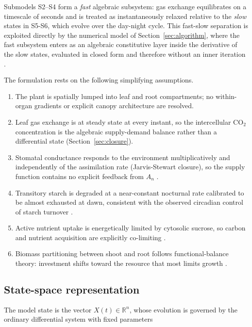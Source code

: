 \documentclass[a4paper,fleqn]{cas-sc}
\begin{document}
Submodels S2--S4 form a \emph{fast} algebraic subsystem: gas exchange
equilibrates on a timescale of seconds and is treated as instantaneously
relaxed relative to the \emph{slow} states in S5-S6, which evolve over the
day-night cycle. This fast-slow separation is exploited directly by the
numerical model of Section~\ref{sec:algorithm}, where the fast subsystem
enters as an algebraic constitutive layer inside the derivative of the slow
states, evaluated in closed form and therefore without an inner iteration
\citep{Cellier1991}.

The formulation rests on the following simplifying assumptions.
\begin{enumerate}\itemsep1pt
\item[(A1)] The plant is spatially lumped into leaf and root compartments;
      no within-organ gradients or explicit canopy architecture are
      resolved.
\item[(A2)] Leaf gas exchange is at steady state at every instant, so
      the intercellular CO$_2$ concentration is the algebraic supply-demand
      balance rather than a differential state (Section~\ref{sec:closure}).
\item[(A3)] Stomatal conductance responds to the environment
      multiplicatively and independently of the assimilation rate
      (Jarvis-Stewart closure), so the supply function contains no explicit
      feedback from $A_n$ \citep{Jarvis1976,Damour2010}.
\item[(A4)] Transitory starch is degraded at a near-constant nocturnal rate
      calibrated to be almost exhausted at dawn, consistent with the
      observed circadian control of starch turnover
      \citep{Graf2010,Scialdone2013}.
\item[(A5)] Active nutrient uptake is energetically limited by cytosolic
      sucrose, so carbon and nutrient acquisition are explicitly co-limiting
      \citep{Smith2007}.
\item[(A6)] Biomass partitioning between shoot and root follows
      functional-balance theory: investment shifts toward the resource that
      most limits growth \citep{Thornley1972,ThornleyJohnson1990}.
\end{enumerate}

\subsection{State-space representation}
\label{sec:state}

The model state is the vector $X(t)\in\mathbb{R}^{n}$, whose evolution is
governed by the ordinary differential system with fixed parameters
\end{document}

